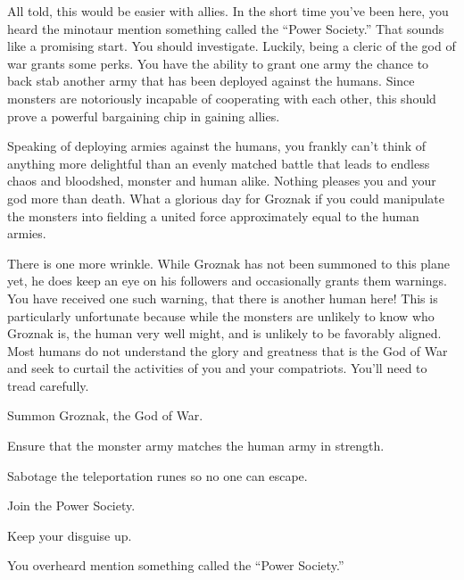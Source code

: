 \documentclass[char]{guildcamp2}
\begin{document}
All told, this would be easier with allies. In the short time you've been here, you heard the minotaur mention something called the ``Power Society.'' That sounds like a promising start. You should investigate. Luckily, being a cleric of the god of war grants some perks. You have the ability to grant one army the chance to back stab another army that has been deployed against the humans. Since monsters are notoriously incapable of cooperating with each other, this should prove a powerful bargaining chip in gaining allies.

Speaking of deploying armies against the humans, you frankly can't think of anything more delightful than an evenly matched battle that leads to endless chaos and bloodshed, monster and human alike. Nothing pleases you and your god more than death. What a glorious day for Groznak if you could manipulate the monsters into fielding a united force approximately equal to the human armies.

There is one more wrinkle. While Groznak has not been summoned to this plane yet, he does keep an eye on his followers and occasionally grants them warnings. You have received one such warning, that there is another human here! This is particularly unfortunate because while the monsters are unlikely to know who Groznak is, the human very well might, and is unlikely to be favorably aligned. Most humans do not understand the glory and greatness that is the God of War and seek to curtail the activities of you and your compatriots. You'll need to tread carefully.

\begin{itemz}[Goals]
	\item Summon Groznak, the God of War.
	\item Ensure that the monster army matches the human army in strength.
	\item Sabotage the teleportation runes so no one can escape.
	\item Join the Power Society.
  \item Keep your disguise up.
\end{itemz}


\begin{contacts}
	\contact{\cMinotaur{}} You overheard \cMinotaur{\them} mention something called the ``Power Society.''
\end{contacts}
\end{document}
